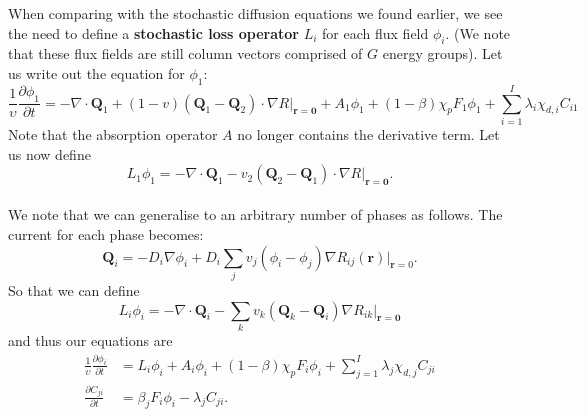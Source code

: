 \documentclass[12pt]{article}
\begin{document}
When comparing with the stochastic diffusion equations we found earlier, we see the need to define a \textbf{stochastic loss operator} $L_i$ for each flux field $\phi_i$. (We note that these flux fields are still column vectors comprised of $G$ energy groups). Let us write out the equation for $\phi_1$:
\begin{equation}
    \frac{1}{\upsilon} \frac{\partial \phi_1}{\partial t}= -\nabla \cdot \mathbf{Q}_1 +(1-v)(\mathbf{Q}_1-\mathbf{Q}_2)\cdot \nabla R|_{\mathbf{r}=\mathbf{0}}+A_1\phi_1 +(1-\beta)\chi_p F_1\phi_1 + \sum_{i=1}^{I}\lambda_i \chi_{d,i}C_{i1}
\end{equation}
Note that the absorption operator $A$ no longer contains the derivative term. Let us now define
\begin{equation}
    L_1 \phi_1=-\nabla \cdot \mathbf{Q}_1 -v_2 (\mathbf{Q}_2-\mathbf{Q}_1)\cdot \nabla R|_{\mathbf{r}=\mathbf{0}}.
\end{equation} \\ 

We note that we can generalise to an arbitrary number of phases as follows. The current for each phase becomes:
\begin{equation}
    \mathbf{Q}_i=-D_i \nabla \phi_i +D_i  \sum_j v_j (\phi_i - \phi_j)\nabla R_{ij}(\mathbf{r})|_{\mathbf{r}=0}.
\end{equation}
So that we can define 
\begin{equation}
     L_i \phi_i=-\nabla \cdot \mathbf{Q}_i - \sum_k v_k (\mathbf{Q}_k-\mathbf{Q}_i) \nabla R_{ik}|_{\mathbf{r}=\mathbf{0}}
\end{equation}
and thus our equations are  
\begin{align}
    \frac{1}{\upsilon} \frac{\partial \phi_i}{\partial t} &=L_i \phi_i +A_i\phi_i +(1-\beta)\chi_p F_i\phi_i+\sum_{j=1}^I\lambda_j \chi_{d,j}C_{ji} \\
    \frac{\partial C_{ji}}{\partial t}&=\beta_j F_i\phi_i-\lambda_j C_{ji}.
\end{align}
\end{document}
